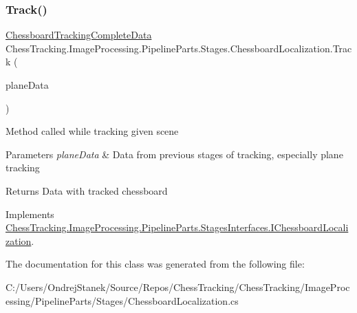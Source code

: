 \subsubsection{\texorpdfstring{Track()}{Track()}}
{\footnotesize\ttfamily \mbox{\hyperlink{class_chess_tracking_1_1_image_processing_1_1_pipeline_data_1_1_chessboard_tracking_complete_data}{Chessboard\+Tracking\+Complete\+Data}} Chess\+Tracking.\+Image\+Processing.\+Pipeline\+Parts.\+Stages.\+Chessboard\+Localization.\+Track (\begin{DoxyParamCaption}\item[{\mbox{\hyperlink{class_chess_tracking_1_1_image_processing_1_1_pipeline_data_1_1_plane_tracking_complete_data}{Plane\+Tracking\+Complete\+Data}}}]{plane\+Data }\end{DoxyParamCaption})}



Method called while tracking given scene 


\begin{DoxyParams}{Parameters}
{\em plane\+Data} & Data from previous stages of tracking, especially plane tracking\\
\hline
\end{DoxyParams}
\begin{DoxyReturn}{Returns}
Data with tracked chessboard
\end{DoxyReturn}


Implements \mbox{\hyperlink{interface_chess_tracking_1_1_image_processing_1_1_pipeline_parts_1_1_stages_interfaces_1_1_i_chessboard_localization_a198327bd00496b49d385b18622245d38}{Chess\+Tracking.\+Image\+Processing.\+Pipeline\+Parts.\+Stages\+Interfaces.\+I\+Chessboard\+Localization}}.



The documentation for this class was generated from the following file\+:\begin{DoxyCompactItemize}
\item 
C\+:/\+Users/\+Ondrej\+Stanek/\+Source/\+Repos/\+Chess\+Tracking/\+Chess\+Tracking/\+Image\+Processing/\+Pipeline\+Parts/\+Stages/Chessboard\+Localization.\+cs\end{DoxyCompactItemize}
